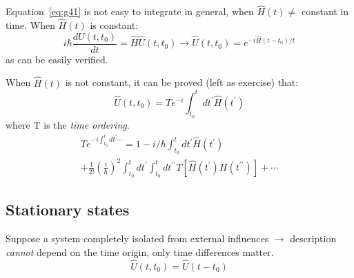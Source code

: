 \documentclass[12pt]{article}
\begin{document}
Equation~\ref{eq:g41} is not easy to integrate in general,
when $\hat{H}(t) \neq$ constant in time.
When $\hat{H}(t)$ is constant:
\begin{equation}
i \hbar \frac{d U\left(t, t_{0}\right)}{d t}=\hat{H} \hat{U}\left(t, t_{0}\right)
\to
\hat{U}\left(t, t_{0}\right)=e^{-i \hat{H}\left(t-t_{0}\right) / t}
\label{eq:g44}
\end{equation}
as can be easily verified.

When $\hat{H}(t)$ is not constant, it can be proved (left as exercise) that:
\begin{equation}
\hat{U}\left(t, t_{0}\right)=T e^{-i} \int_{t_{0}}^{t} d t^{\prime} \hat{H}\left(t^{\prime}\right)
\end{equation} 
where T is the \emph{time ordering}.
\begin{equation}
\begin{gathered}
T e^{-i \int_{t_{0}}^{t} d t^{\prime} \cdots} = 1 
-i / \hbar \int_{t_{0}}^{t} dt^{\prime} \hat{H}\left(t^{\prime}\right)\\
+
\frac{1}{2 !}\left(\frac{i}{\hbar}\right)^{2} \int_{t_{0}}^{t} d t^{\prime} \int_{t_{0}}^{t} d t^{\prime \prime} T\left[\hat{H}\left(t^{\prime}\right) H\left(t^{\prime \prime}\right)\right]+\cdots
\end{gathered}
\end{equation}

\subsection{Stationary states}

Suppose a system completely isolated from 
external influences $\to$ description \emph{cannot} depend
on the time origin, only time differences matter.
\begin{equation}
\hat{U}\left(t, t_{0}\right)=\hat{U}\left(t-t_{0}\right)
\end{equation}

\end{document}
